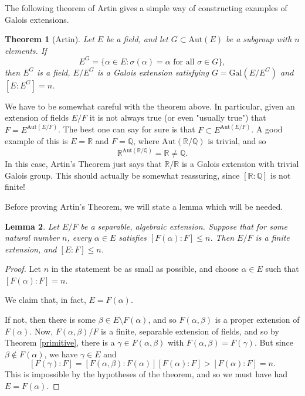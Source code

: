 \documentclass[12pt]{report}
\newtheorem{thm}{Theorem}[section]
\newtheorem{lemma}[thm]{Lemma}
\theoremstyle{definition}
\def\QQ{\mathbb{Q}}
\def\RR{\mathbb{R}}
\def\Aut{\text{Aut}}
\def\aa{\alpha}
\def\bb{\beta}
\def\Gal{\text{Gal}}
\begin{document}
The following theorem of Artin gives a simple way of constructing examples
of Galois extensions.

\begin{thm}[Artin]\label{artin}
    Let $E$ be a field, and let $G \subset \Aut(E)$ be a subgroup with $n$ elements. If $$E^G = \{ \aa\in E : \sigma(\aa) = \aa \mbox{ for all } \sigma \in G\},$$ then $E^G$ is a field, $E/E^G$ is a Galois extension satisfying $G = \Gal(E/E^G)$ and $[E : E^G] = n$.
\end{thm}

We have to be somewhat careful with the theorem above. In particular, given an extension of fields $E/F$ it is not always true (or even "usually true") that $F = E^{\Aut(E/F)}$. The best one can say for sure is that $F \subset E^{\Aut(E/F)}$. A good example of this is $E = \RR$ and $F = \QQ$, where $\Aut(\RR/\QQ)$ is trivial, and so $$\RR^{\Aut(\RR/\QQ)} = \RR \not= \QQ.$$
In this case, Artin's Theorem just says that $\RR/\RR$ is a Galois extension with trivial Galois group. This should actually be somewhat reassuring, since $[\RR : \QQ]$ is not finite! 

Before proving Artin's Theorem, we will state a lemma which will be
needed.

\begin{lemma}
    Let $E/F$ be a separable, algebraic extension. Suppose that for some natural number $n$, every $\aa \in E$ satisfies $[F(\aa) : F] \leq n$. Then $E/F$ is a finite extension, and $[E : F] \leq n$.
\end{lemma}

\begin{proof}
    Let $n$ in the statement be as small as possible, and choose $\aa \in E$ such that $[F(\aa) : F] = n$. 
    
    We claim that, in fact, $E = F(\aa)$.

    If not, then there is some $\bb \in E\setminus F(\aa)$, and so $F(\aa,\bb)$ is a proper extension of $F(\aa)$. Now, $F(\aa,\bb)/F$ is a finite, separable extension of fields, and so by Theorem \ref{primitive}, there is a $\gamma \in F(\aa,\bb)$ with $F(\aa,\bb) = F(\gamma)$. But since $\bb \notin F(\aa)$, we have $\gamma\in E$ and
    $$[F(\gamma) : F] = [F(\aa,\bb) : F(\aa)][F(\aa) : F] > [F(\aa) : F] = n.$$
    This is impossible by the hypotheses of the theorem, and so we must have had $E = F(\aa)$.
\end{proof}
\end{document}

